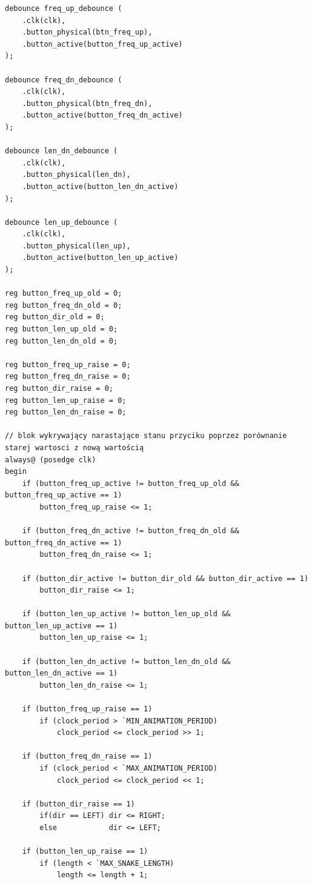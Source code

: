\documentclass[a4paper]{article}
\begin{document}
\begin{verbatim}
debounce freq_up_debounce ( 
    .clk(clk),
    .button_physical(btn_freq_up),
    .button_active(button_freq_up_active)
);

debounce freq_dn_debounce ( 
    .clk(clk),
    .button_physical(btn_freq_dn),
    .button_active(button_freq_dn_active)
);

debounce len_dn_debounce ( 
    .clk(clk),
    .button_physical(len_dn),
    .button_active(button_len_dn_active)
);

debounce len_up_debounce ( 
    .clk(clk),
    .button_physical(len_up),
    .button_active(button_len_up_active)
);

reg button_freq_up_old = 0;
reg button_freq_dn_old = 0;
reg button_dir_old = 0;
reg button_len_up_old = 0;
reg button_len_dn_old = 0;

reg button_freq_up_raise = 0;
reg button_freq_dn_raise = 0;
reg button_dir_raise = 0;
reg button_len_up_raise = 0;
reg button_len_dn_raise = 0;

// blok wykrywający narastające stanu przyciku poprzez porównanie starej wartosci z nową wartością
always@ (posedge clk)
begin
    if (button_freq_up_active != button_freq_up_old && button_freq_up_active == 1)
        button_freq_up_raise <= 1;
        
    if (button_freq_dn_active != button_freq_dn_old && button_freq_dn_active == 1)
        button_freq_dn_raise <= 1;
        
    if (button_dir_active != button_dir_old && button_dir_active == 1)
        button_dir_raise <= 1;
        
    if (button_len_up_active != button_len_up_old && button_len_up_active == 1)
        button_len_up_raise <= 1;
        
    if (button_len_dn_active != button_len_dn_old && button_len_dn_active == 1)
        button_len_dn_raise <= 1;
       
    if (button_freq_up_raise == 1)
        if (clock_period > `MIN_ANIMATION_PERIOD)
            clock_period <= clock_period >> 1;
       
    if (button_freq_dn_raise == 1)
        if (clock_period < `MAX_ANIMATION_PERIOD) 
            clock_period <= clock_period << 1;
        
    if (button_dir_raise == 1)
        if(dir == LEFT) dir <= RIGHT;
        else            dir <= LEFT;
    
    if (button_len_up_raise == 1)
        if (length < `MAX_SNAKE_LENGTH) 
            length <= length + 1;
            

\end{verbatim}
\end{document}
